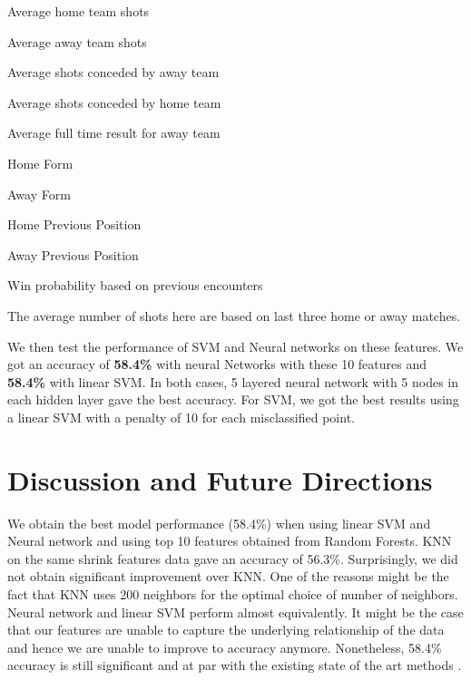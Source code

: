 \documentclass{article}
\begin{document}
\begin{itemize}
	\begin{minipage}{0.5\linewidth}
		\item Average home team shots 
		\item Average away team shots 
		\item Average shots conceded by away team 
		\item Average shots conceded by home team 
		\item Average full time result for away team 
	\end{minipage}
	\begin{minipage}{0.5\linewidth}
		\item Home Form
		\item Away Form
		\item Home Previous Position
		\item Away Previous Position
		\item Win probability based on previous encounters
	\end{minipage}
\end{itemize}

The average number of shots here are based on last three home or away matches.

We then test the performance of SVM and Neural networks on these features. We got an accuracy of \textbf{58.4\%} with neural Networks with these 10 features and \textbf{58.4\%} with linear SVM. In both cases, 5 layered neural network with 5 nodes in each hidden layer gave the best accuracy.  For SVM, we got the best results using a linear SVM with a penalty of 10 for each misclassified point.

\section{Discussion and Future Directions}
We obtain the best model performance  (58.4\%) when using linear SVM and Neural network and using top 10 features obtained from Random Forests. KNN on the same shrink features data gave an accuracy of 56.3\%. Surprisingly, we did not obtain significant improvement over KNN. One of the reasons might be the fact that KNN uses 200 neighbors for the optimal choice of number of neighbors. Neural network and linear SVM perform almost equivalently.
It might be the case that our features are unable to capture the underlying relationship of the data and hence we are unable to improve to accuracy anymore. Nonetheless, 58.4\% accuracy is still significant and at par with the existing state of the art methods \cite{sunilThesis}. 
\end{document}
